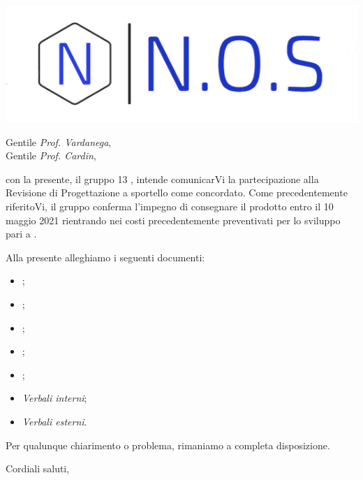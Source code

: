 \documentclass[12pt]{letter}
\date{08 marzo 2021}
\begin{document}
\begin{letter}{ }

\includegraphics[scale=1.5
]{../../../Immagini/N.O.S.jpg}

\opening{Gentile \textit{Prof. Vardanega},\\ Gentile \textit{Prof. Cardin}, }

con la presente, il gruppo 13 {\Gruppo}, intende comunicarVi la partecipazione alla Revisione di Progettazione a sportello come concordato.
Come precedentemente riferitoVi, il gruppo conferma l'impegno di consegnare il prodotto entro il 10 maggio 2021 rientrando nei costi precedentemente preventivati per lo sviluppo pari a .

Alla presente alleghiamo i seguenti documenti:

\begin{itemize}
	\item {};
	\item {};
	\item {};
	\item {};
	\item {};
	\item \textit{Verbali interni};
	\item \textit{Verbali esterni}.
\end{itemize}

Per qualunque chiarimento o problema, rimaniamo a completa disposizione.

\closing{Cordiali saluti, }

\vspace{2em}

\end{letter}
\end{document}
